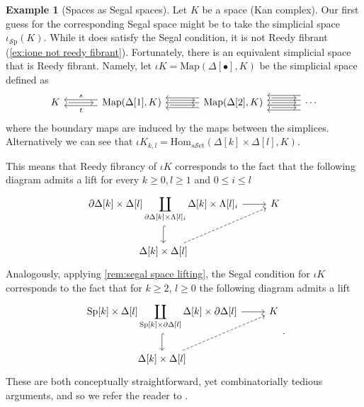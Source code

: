 \documentclass[11pt, a4paper]{amsart}
\newcommand{\Hom}{\mathrm{Hom}}
\newcommand{\Map}{\mathrm{Map}}
\newcommand{\sSet}{s\mathscr{S}\mathrm{et}}
\newcommand{\Sp}{\mathrm{Sp}}
\newcommand{\incspace}{\iota_{\mathscr{S}\mathrm{p}}}
\theoremstyle{definition}
\newtheorem{example}[equation]{Example}
\theoremstyle{remark}
\numberwithin{equation}{section}
\begin{document}
 \begin{example}[Spaces as Segal spaces] \label{ex:spaces are segal spaces}
  Let $K$ be a space (Kan complex). Our first guess for the corresponding Segal space might be to take the simplicial space $\incspace(K)$. While it does satisfy the Segal condition, it is not Reedy fibrant (\cref{ex:ione not reedy fibrant}). Fortunately, there is an equivalent simplicial space that is Reedy fibrant. Namely, let $\iota K = \Map(\Delta[\bullet],K)$ be the simplicial space defined as 
  \[
  \begin{tikzcd}[column sep=1.2cm]
   K \arrow[r, shorten >=1ex,shorten <=1ex]
   & {\Map(\Delta[1],K)}
   \arrow[l, shift left=1.2, "t"] \arrow[l, shift right=1.2, "s"'] 
   \arrow[r, shift right, shorten >=1ex,shorten <=1ex ] \arrow[r, shift left, shorten >=1ex,shorten <=1ex] 
   & {\Map(\Delta[2],K)} 
   \arrow[l] \arrow[l, shift left=2] \arrow[l, shift right=2] 
   \arrow[r, shorten >=1ex,shorten <=1ex] \arrow[r, shift left=2, shorten >=1ex,shorten <=1ex] 
   \arrow[r, shift right=2, shorten >=1ex,shorten <=1ex]
   & \cdots 
   \arrow[l, shift right=1] \arrow[l, shift left=1] \arrow[l, shift right=3] \arrow[l, shift left=3] 
 \end{tikzcd}
  \]
  where the boundary maps are induced by the maps between the simplices. Alternatively we can see that $\iota K_{k,l} = \Hom_{\sSet}(\Delta[k] \times \Delta[l],K)$. 

  This means that Reedy fibrancy of $\iota K$ corresponds to the fact that the following diagram admits a lift for every $k \geq 0,l \geq 1$ and $0 \leq i \leq l$
  \[
  \begin{tikzcd}
   \displaystyle \partial \Delta[k] \times \Delta[l] \coprod_{\partial \Delta[k] \times \Lambda[l]_i} \Delta[k] \times \Lambda[l]_i \arrow[r] \arrow[d, hook] & K \\
   \Delta[k] \times \Delta[l] \arrow[ur, dashed] & 
  \end{tikzcd}
  \]
  Analogously, applying \cref{rem:segal space lifting}, the Segal condition for $\iota K$ corresponds to the fact that for $k \geq 2$, $l \geq 0$ the following diagram admits a lift
  \[
   \begin{tikzcd}
    \displaystyle \Sp[k] \times \Delta[l] \coprod_{\Sp[k] \times \partial \Delta[l]} \Delta[k] \times \partial \Delta[l] \arrow[r] \arrow[d, hook] & K \\
    \Delta[k] \times \Delta[l] \arrow[ur, dashed] & 
   \end{tikzcd}.
  \]
  These are both conceptually straightforward, yet combinatorially tedious arguments, and so we refer the reader to \cite[Corollary 4.3, Corollary 4.6]{goerssjardine2009simplicialhomotopytheory}.
  

\end{example}
\end{document}
